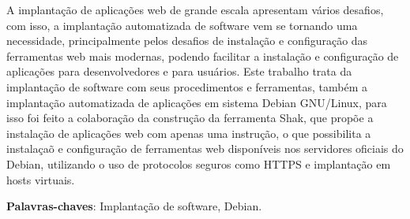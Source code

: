 \begin{resumo}

A implantação de aplicações web de grande escala apresentam vários desafios, com
isso, a implantação automatizada de software vem se tornando uma necessidade,
principalmente pelos desafios de instalação e configuração das ferramentas web
mais modernas, podendo facilitar a instalação e configuração de aplicações para
desenvolvedores e para usuários. Este trabalho trata da implantação de software
com seus procedimentos e ferramentas, também a implantação  automatizada de
aplicações em sistema Debian GNU/Linux, para isso foi feito a colaboração da
construção da ferramenta Shak, que propõe a instalação de aplicações web com
apenas uma instrução, o que possibilita a instalaçaõ e configuração de ferramentas
web disponíveis nos servidores oficiais do Debian, utilizando o uso de protocolos
seguros como HTTPS e implantação em hosts virtuais.
 \vspace{\onelineskip}

 \noindent
 \textbf{Palavras-chaves}: Implantação de software, Debian.
\end{resumo}
